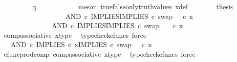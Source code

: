 \begin{isabellebody}
\ \ \ \ \ \ \isamarkupfalse%
\ \isamarkupfalse%
\ {\isachardoublequoteopen}q\ {\isacharequal}{\kern0pt}\ {\isasymf}{\isachardoublequoteclose}\isanewline
\ \ \ \ \ \ \ \ \isamarkupfalse%
\ {\isacharparenleft}{\kern0pt}meson\ true{\isacharunderscore}{\kern0pt}false{\isacharunderscore}{\kern0pt}only{\isacharunderscore}{\kern0pt}truth{\isacharunderscore}{\kern0pt}values\ x{\isacharunderscore}{\kern0pt}def{\isacharparenright}{\kern0pt}\isanewline
\ \ \ \ \ \ \isamarkupfalse%
\ {\isacharquery}{\kern0pt}thesis\isanewline
\ \ \ \ \ \ \isamarkupfalse%
\ {\isacharminus}{\kern0pt}\ \isanewline
\ \ \ \ \ \ \ \ \isamarkupfalse%
\ {\isachardoublequoteopen}{\isacharparenleft}{\kern0pt}AND\ {\isasymcirc}\isactrlsub c\ {\isasymlangle}IMPLIES{\isacharcomma}{\kern0pt}IMPLIES\ {\isasymcirc}\isactrlsub c\ swap\ {\isasymOmega}\ {\isasymOmega}{\isasymrangle}{\isacharparenright}{\kern0pt}\ {\isasymcirc}\isactrlsub c\ x\ {\isacharequal}{\kern0pt}\ \ \ \ \isanewline
\ \ \ \ \ \ \ \ \ \ \ \ \ \ \ AND\ {\isasymcirc}\isactrlsub c\ {\isasymlangle}IMPLIES{\isacharcomma}{\kern0pt}IMPLIES\ {\isasymcirc}\isactrlsub c\ swap\ {\isasymOmega}\ {\isasymOmega}{\isasymrangle}\ \ {\isasymcirc}\isactrlsub c\ x{\isachardoublequoteclose}\isanewline
\ \ \ \ \ \ \ \ \ \ \isamarkupfalse%
\ comp{\isacharunderscore}{\kern0pt}associative{}\ x{\isacharunderscore}{\kern0pt}type\ \isamarkupfalse%
\ {\isacharparenleft}{\kern0pt}typecheck{\isacharunderscore}{\kern0pt}cfuncs{\isacharcomma}{\kern0pt}\ force{\isacharparenright}{\kern0pt}\isanewline
\ \ \ \ \ \ \ \ \isamarkupfalse%
\ \isamarkupfalse%
\ {\isachardoublequoteopen}{\isachardot}{\kern0pt}{\isachardot}{\kern0pt}{\isachardot}{\kern0pt}\ {\isacharequal}{\kern0pt}\ AND\ {\isasymcirc}\isactrlsub c\ {\isasymlangle}IMPLIES\ {\isasymcirc}\isactrlsub c\ x{\isacharcomma}{\kern0pt}IMPLIES\ {\isasymcirc}\isactrlsub c\ swap\ {\isasymOmega}\ {\isasymOmega}\ {\isasymcirc}\isactrlsub c\ x{\isasymrangle}{\isachardoublequoteclose}\isanewline
\ \ \ \ \ \ \ \ \ \ \isamarkupfalse%
\ cfunc{\isacharunderscore}{\kern0pt}prod{\isacharunderscore}{\kern0pt}comp\ comp{\isacharunderscore}{\kern0pt}associative{}\ x{\isacharunderscore}{\kern0pt}type\ \isamarkupfalse%
\ {\isacharparenleft}{\kern0pt}typecheck{\isacharunderscore}{\kern0pt}cfuncs{\isacharcomma}{\kern0pt}\ force{\isacharparenright}{\kern0pt}\isanewline
\ \ \ \ \ \ \ \ \isamarkupfalse%

\end{isabellebody}
